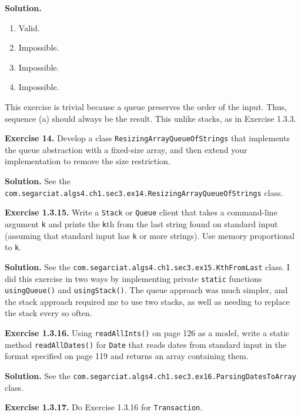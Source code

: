 \documentclass[12pt, a4paper]{article}
\newenvironment{ex}[2][Exercise]
{\par\medskip\noindent \textbf{#1 #2.}}
{\medskip}
\newenvironment{sol}[1][Solution]
{\par\medskip\noindent \textbf{#1.} }
{\medskip}
\begin{document}
	\begin{sol}
		\begin{enumerate}[label=(\alph*)]
			\item Valid.
			\item Impossible.
			\item Impossible.
			\item Impossible.
		\end{enumerate}
		This exercise is trivial because a queue preserves the order of the input.
		Thus, sequence (a) should always be the result. This unlike stacks, as in Exercise 1.3.3.
	\end{sol}
	\begin{ex}{14}
		Develop a class \texttt{ResizingArrayQueueOfStrings} that implements the queue abstraction
		with a fixed-size array, and then extend your implementation to remove the size restriction.
	\end{ex}
	\begin{sol}
		See the \texttt{com.segarciat.algs4.ch1.sec3.ex14.ResizingArrayQueueOfStrings} class.
	\end{sol}
	\begin{ex}{1.3.15}
		Write a \texttt{Stack} or \texttt{Queue} client that takes a command-line argument
		\texttt{k} and prints the \texttt{k}th from the last string found on standard input
		(assuming that standard input has \texttt{k} or more strings). Use memory proportional
		to \texttt{k}.
	\end{ex}
	\begin{sol}
		See the \texttt{com.segarciat.algs4.ch1.sec3.ex15.KthFromLast} class. I did this
		exercise in two ways by implementing private \texttt{static} functions
		\texttt{usingQueue()} and \texttt{usingStack()}. The queue approach was much
		simpler, and the stack approach required me to use two stacks, as well as
		needing to replace the stack every so often.
	\end{sol}
	\begin{ex}{1.3.16}
		Using \texttt{readAllInts()} on page 126 as a model, write a static method
		\texttt{readAllDates()} for \texttt{Date} that reads dates from standard input
		in the format specified on page 119 and returns an array containing them.
	\end{ex}
	\begin{sol}
		See the \texttt{com.segarciat.algs4.ch1.sec3.ex16.ParsingDatesToArray} class.
	\end{sol}
	\begin{ex}{1.3.17}
		Do Exercise 1.3.16 for \texttt{Transaction}.
	\end{ex}
\end{document}
